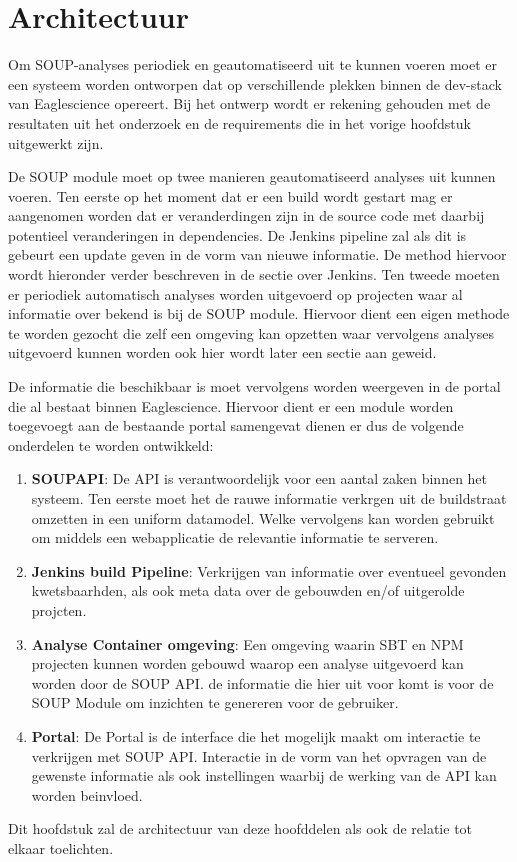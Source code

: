 \chapter{Architectuur}\label{ch:functioneel-ontwerp} %

Om SOUP-analyses periodiek en geautomatiseerd uit te kunnen voeren moet er een systeem worden ontworpen dat op verschillende plekken binnen de dev-stack van Eaglescience opereert. Bij het ontwerp wordt er rekening gehouden met de resultaten uit het onderzoek en de requirements die in het vorige hoofdstuk uitgewerkt zijn.


De SOUP module moet op twee manieren geautomatiseerd analyses uit kunnen voeren. Ten eerste op het moment dat er een build wordt gestart mag er aangenomen worden dat er veranderdingen zijn in de source code met daarbij potentieel veranderingen in dependencies. De Jenkins pipeline zal als dit is gebeurt een update geven in de vorm van nieuwe informatie. De method hiervoor wordt hieronder verder beschreven in de sectie over Jenkins. Ten tweede moeten er periodiek automatisch analyses worden uitgevoerd op projecten waar al informatie over bekend is bij de SOUP module. Hiervoor dient een eigen methode te worden gezocht die zelf een omgeving kan opzetten waar vervolgens analyses uitgevoerd kunnen worden ook hier wordt later een sectie aan geweid.

De informatie die beschikbaar is moet vervolgens worden weergeven in de portal die al bestaat binnen Eaglescience. Hiervoor dient er een module worden toegevoegt aan de bestaande portal samengevat dienen er dus de volgende onderdelen te worden ontwikkeld:

\begin{enumerate}
    \item \textbf{SOUPAPI}: De API is verantwoordelijk voor een aantal zaken binnen het systeem. Ten eerste moet het de rauwe informatie verkrgen uit de buildstraat omzetten in een uniform datamodel. Welke vervolgens kan worden gebruikt om middels een webapplicatie de relevantie informatie te serveren.
    \item \textbf{Jenkins build Pipeline}: Verkrijgen van informatie over eventueel gevonden kwetsbaarhden, als ook meta data over de gebouwden en/of uitgerolde projcten.
    \item \textbf{Analyse Container omgeving}: Een omgeving waarin SBT en NPM projecten kunnen worden gebouwd waarop een analyse uitgevoerd kan worden door de SOUP API. de informatie die hier uit voor komt is voor de SOUP Module om inzichten te genereren voor de gebruiker.
    \item \textbf{Portal}: De Portal is de interface die het mogelijk maakt om interactie te verkrijgen met SOUP API. Interactie in de vorm van het opvragen van de gewenste informatie als ook instellingen waarbij de werking van de API kan worden beinvloed.
\end{enumerate}
Dit hoofdstuk zal de architectuur van deze hoofddelen als ook de relatie tot elkaar toelichten.


